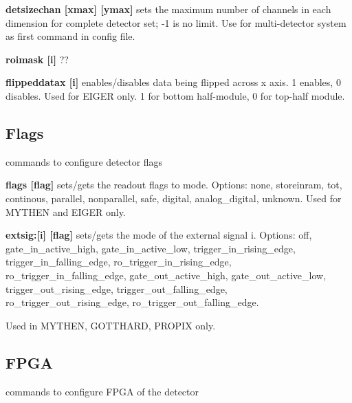 \begin{DoxyItemize}
\item {\bfseries detsizechan \mbox{[}xmax\mbox{]} \mbox{[}ymax\mbox{]}} sets the maximum number of channels in each dimension for complete detector set; -\/1 is no limit. Use for multi-\/detector system as first command in config file.
\end{DoxyItemize}


\begin{DoxyItemize}
\item {\bfseries roimask \mbox{[}i\mbox{]}} ??
\end{DoxyItemize}


\begin{DoxyItemize}
\item {\bfseries flippeddatax \mbox{[}i\mbox{]}} enables/disables data being flipped across x axis. 1 enables, 0 disables. Used for EIGER only. 1 for bottom half-\/module, 0 for top-\/half module.
\end{DoxyItemize}\hypertarget{config_configflags}{}\subsection{Flags}\label{config_configflags}
commands to configure detector flags


\begin{DoxyItemize}
\item {\bfseries flags \mbox{[}flag\mbox{]}} sets/gets the readout flags to mode. Options: none, storeinram, tot, continous, parallel, nonparallel, safe, digital, analog\_\-digital, unknown. Used for MYTHEN and EIGER only.
\end{DoxyItemize}


\begin{DoxyItemize}
\item {\bfseries extsig:\mbox{[}i\mbox{]} \mbox{[}flag\mbox{]}} sets/gets the mode of the external signal i. Options: {\ttfamily off}, {\ttfamily gate\_\-in\_\-active\_\-high}, {\ttfamily gate\_\-in\_\-active\_\-low}, {\ttfamily trigger\_\-in\_\-rising\_\-edge}, {\ttfamily trigger\_\-in\_\-falling\_\-edge}, {\ttfamily ro\_\-trigger\_\-in\_\-rising\_\-edge}, {\ttfamily ro\_\-trigger\_\-in\_\-falling\_\-edge}, {\ttfamily gate\_\-out\_\-active\_\-high}, {\ttfamily gate\_\-out\_\-active\_\-low}, {\ttfamily trigger\_\-out\_\-rising\_\-edge}, {\ttfamily trigger\_\-out\_\-falling\_\-edge}, {\ttfamily ro\_\-trigger\_\-out\_\-rising\_\-edge}, {\ttfamily ro\_\-trigger\_\-out\_\-falling\_\-edge}. \par
 Used in MYTHEN, GOTTHARD, PROPIX only.
\end{DoxyItemize}\hypertarget{config_configfpga}{}\subsection{FPGA}\label{config_configfpga}
commands to configure FPGA of the detector


